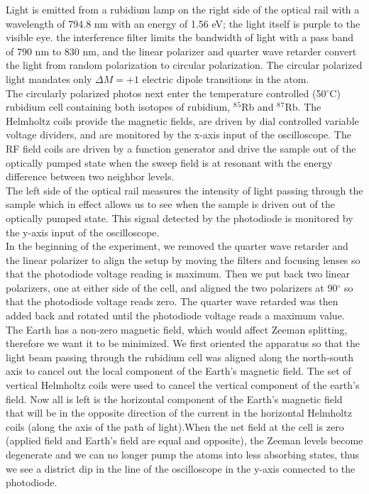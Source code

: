 \documentclass[prb,preprint]{revtex4-1}
\begin{document}
Light is emitted from a rubidium lamp on the right side of the optical rail with a wavelength of 794.8 nm with an energy of 1.56 eV; the light itself is purple to the visible eye.  the interference filter limits the bandwidth of light with a pass band of 790 nm to 830 nm, and the linear polarizer and quarter wave retarder convert the light from random polarization to circular polarization. The circular polarized light mandates only $\Delta M=+1$ electric dipole transitions in the atom.\\

The circularly polarized photos next enter the temperature controlled (50$^{\circ}$C) rubidium cell containing both isotopes of rubidium,   $^8$$^5$Rb and $^8$$^7$Rb. The Helmholtz coils provide the magnetic fields, are driven by dial controlled variable voltage dividers, and are monitored by the x-axis input of the oscilloscope. The RF field coils are driven by a function generator and drive the sample out of the optically pumped state when the sweep field is at resonant with the energy difference between two neighbor levels.\\

The left side of the optical rail measures the intensity of light passing through the sample which in effect allows us to see when the sample is driven out of the optically pumped state. This signal detected by the photodiode is monitored by the y-axis input of the oscilloscope. \\

In the beginning of the experiment, we removed the quarter wave retarder and the linear polarizer to align the setup by moving the filters and focusing lenses so that the photodiode voltage reading is maximum. Then we put back two linear polarizers, one at either side of the cell, and aligned the two polarizers at 90$^{\circ}$ so that the photodiode voltage reads zero. The quarter wave retarded was then added back and rotated until the photodiode voltage reads a maximum value.\\


The Earth has a non-zero magnetic field, which would affect Zeeman splitting, therefore we want it to be minimized. We first oriented the apparatus so that the light beam passing through the rubidium cell was aligned along the north-south axis to cancel out the local component of the Earth's magnetic field. The set of vertical Helmholtz coils were used to cancel the vertical component of the earth's field. Now all is left is the horizontal component of the Earth's magnetic field that will be in the opposite direction of the current in the horizontal Helmholtz coils (along the axis of the path of light).When the net field at the cell is zero (applied field and Earth's field are equal and opposite), the Zeeman levels become degenerate and we can no longer pump the atoms into less absorbing states, thus we see a district dip in the line of the oscilloscope in the y-axis connected to the photodiode.\\
\end{document}
